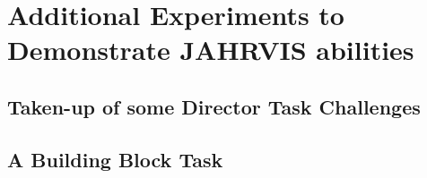 \documentclass[a4paper,11pt,twoside]{StyleThese}
\begin{document}
	\setcounter{chapter}{2} %
	\dominitoc
	\faketableofcontents
	\fi


\chapter{Additional Experiments to Demonstrate JAHRVIS abilities}
\label{chapter:chap5}
\minitoc

\section{Taken-up of some Director Task Challenges}

\section{A Building Block Task}

\ifdefined{}
\else


\end{document}
